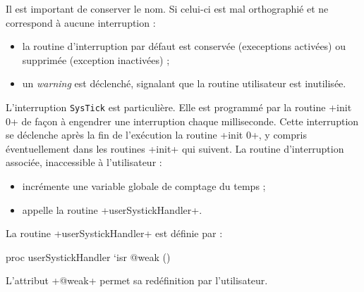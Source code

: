 Il est important de conserver le nom. Si celui-ci est mal orthographié et ne correspond à aucune interruption :
\begin{itemize}
  \item la routine d'interruption par défaut est conservée (execeptions activées) ou supprimée (exception inactivées) ;
  \item un \emph{warning} est déclenché, signalant que la routine utilisateur est inutilisée.
\end{itemize}




L'interruption \texttt{SysTick} est particulière. Elle est programmé par la routine \plm+init 0+ de façon à engendrer une interruption chaque milliseconde. Cette interruption se déclenche après la fin de l'exécution la routine \plm+init 0+, y compris éventuellement dans les routines \plm+init+ qui suivent. La routine d'interruption associée, inaccessible à l'utilisateur :
\begin{itemize}
  \item incrémente une variable globale de comptage du temps ;
  \item appelle la routine \plm+userSystickHandler+.
\end{itemize}

La routine \plm+userSystickHandler+ est définie par :
\begin{PLM}[1]
proc userSystickHandler `isr @weak () {
}
\end{PLM}

L'attribut \plm+@weak+ permet sa redéfinition par l'utilisateur.



